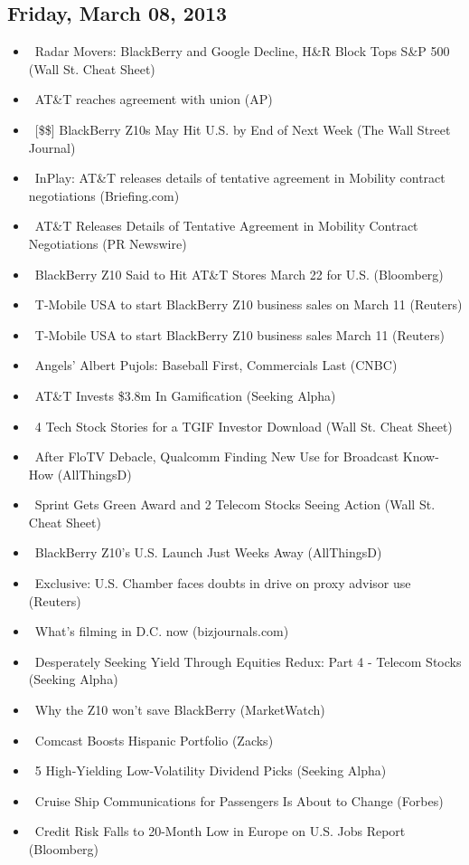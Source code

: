 \documentclass[11pt,asymmetric]{article}
\begin{document}
\subsection*{Friday, March 08, 2013}
\begin{itemize}
\item\ Radar Movers: BlackBerry and Google Decline, H\&R Block Tops S\&P 500 (Wall St. Cheat Sheet)
\item\ AT\&T reaches agreement with union (AP)
\item\ [\$\$] BlackBerry Z10s May Hit U.S. by End of Next Week (The Wall Street Journal)
\item\ InPlay: AT\&T releases details of tentative agreement in Mobility contract negotiations (Briefing.com)
\item\ AT\&T Releases Details of Tentative Agreement in Mobility Contract Negotiations (PR Newswire)
\item\ BlackBerry Z10 Said to Hit AT\&T Stores March 22 for U.S. (Bloomberg)
\item\ T-Mobile USA to start BlackBerry Z10 business sales on March 11 (Reuters)
\item\ T-Mobile USA to start BlackBerry Z10 business sales March 11 (Reuters)
\item\ Angels' Albert Pujols: Baseball First, Commercials Last (CNBC)
\item\ AT\&T Invests \$3.8m In Gamification (Seeking Alpha)
\item\ 4 Tech Stock Stories for a TGIF Investor Download (Wall St. Cheat Sheet)
\item\ After FloTV Debacle, Qualcomm Finding New Use for Broadcast Know-How (AllThingsD)
\item\ Sprint Gets Green Award and 2 Telecom Stocks Seeing Action (Wall St. Cheat Sheet)
\item\ BlackBerry Z10's U.S. Launch Just Weeks Away (AllThingsD)
\item\ Exclusive: U.S. Chamber faces doubts in drive on proxy advisor use (Reuters)
\item\ What's filming in D.C. now (bizjournals.com)
\item\ Desperately Seeking Yield Through Equities Redux: Part 4 - Telecom Stocks (Seeking Alpha)
\item\ Why the Z10 won’t save BlackBerry (MarketWatch)
\item\ Comcast Boosts Hispanic Portfolio (Zacks)
\item\ 5 High-Yielding Low-Volatility Dividend Picks (Seeking Alpha)
\item\ Cruise Ship Communications for Passengers Is About to Change (Forbes)
\item\ Credit Risk Falls to 20-Month Low in Europe on U.S. Jobs Report (Bloomberg)
\end{itemize}
\end{document}
